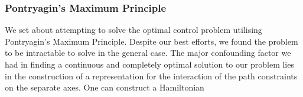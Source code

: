 \subsubsection{Pontryagin's Maximum Principle}

We set about attempting to solve the optimal control problem utilising Pontryagin's Maximum Principle. Despite our best efforts, we found the problem to be intractable to solve in the general case.
The major confounding factor we had in finding a continuous and completely optimal solution to our problem lies in the construction of a representation for the interaction of the path constraints on the separate axes.
One can construct a Hamiltonian
